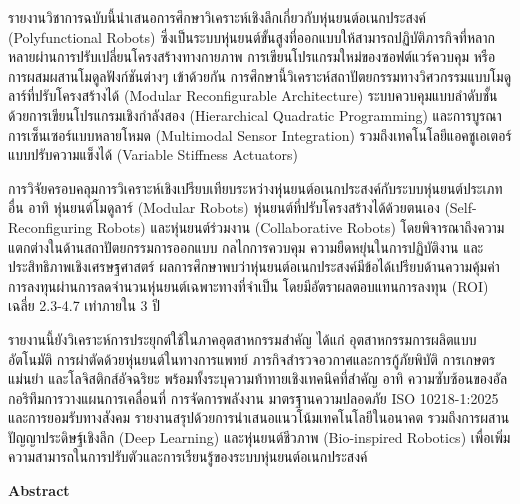 \documentclass[a4paper]{article}
\begin{document}
\begin{justify}
  รายงานวิชาการฉบับนี้นำเสนอการศึกษาวิเคราะห์เชิงลึกเกี่ยวกับหุ่นยนต์อเนกประสงค์ (Polyfunctional Robots) ซึ่งเป็นระบบหุ่นยนต์ขั้นสูงที่ออกแบบให้สามารถปฏิบัติภารกิจที่หลากหลายผ่านการปรับเปลี่ยนโครงสร้างทางกายภาพ การเขียนโปรแกรมใหม่ของซอฟต์แวร์ควบคุม หรือการผสมผสานโมดูลฟังก์ชันต่างๆ เข้าด้วยกัน การศึกษานี้วิเคราะห์สถาปัตยกรรมทางวิศวกรรมแบบโมดูลาร์ที่ปรับโครงสร้างได้ (Modular Reconfigurable Architecture) ระบบควบคุมแบบลำดับชั้นด้วยการเขียนโปรแกรมเชิงกำลังสอง (Hierarchical Quadratic Programming) และการบูรณาการเซ็นเซอร์แบบหลายโหมด (Multimodal Sensor Integration) รวมถึงเทคโนโลยีแอคชูเอเตอร์แบบปรับความแข็งได้ (Variable Stiffness Actuators)
  
  การวิจัยครอบคลุมการวิเคราะห์เชิงเปรียบเทียบระหว่างหุ่นยนต์อเนกประสงค์กับระบบหุ่นยนต์ประเภทอื่น อาทิ หุ่นยนต์โมดูลาร์ (Modular Robots) หุ่นยนต์ที่ปรับโครงสร้างได้ด้วยตนเอง (Self-Reconfiguring Robots) และหุ่นยนต์ร่วมงาน (Collaborative Robots) โดยพิจารณาถึงความแตกต่างในด้านสถาปัตยกรรมการออกแบบ กลไกการควบคุม ความยืดหยุ่นในการปฏิบัติงาน และประสิทธิภาพเชิงเศรษฐศาสตร์ ผลการศึกษาพบว่าหุ่นยนต์อเนกประสงค์มีข้อได้เปรียบด้านความคุ้มค่าการลงทุนผ่านการลดจำนวนหุ่นยนต์เฉพาะทางที่จำเป็น โดยมีอัตราผลตอบแทนการลงทุน (ROI) เฉลี่ย 2.3-4.7 เท่าภายใน 3 ปี
  
  รายงานนี้ยังวิเคราะห์การประยุกต์ใช้ในภาคอุตสาหกรรมสำคัญ ได้แก่ อุตสาหกรรมการผลิตแบบอัตโนมัติ การผ่าตัดด้วยหุ่นยนต์ในทางการแพทย์ ภารกิจสำรวจอวกาศและการกู้ภัยพิบัติ การเกษตรแม่นยำ และโลจิสติกส์อัจฉริยะ พร้อมทั้งระบุความท้าทายเชิงเทคนิคที่สำคัญ อาทิ ความซับซ้อนของอัลกอริทึมการวางแผนการเคลื่อนที่ การจัดการพลังงาน มาตรฐานความปลอดภัย ISO 10218-1:2025 และการยอมรับทางสังคม รายงานสรุปด้วยการนำเสนอแนวโน้มเทคโนโลยีในอนาคต รวมถึงการผสานปัญญาประดิษฐ์เชิงลึก (Deep Learning) และหุ่นยนต์ชีวภาพ (Bio-inspired Robotics) เพื่อเพิ่มความสามารถในการปรับตัวและการเรียนรู้ของระบบหุ่นยนต์อเนกประสงค์
  \end{justify}

\vspace{1em}

\noindent
{\centering
    {\fontsize{18pt}{22pt}\selectfont\textbf{Abstract}\par}
}
\end{document}
